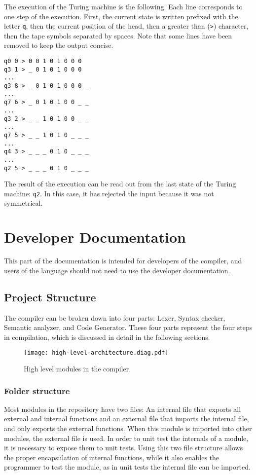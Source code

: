 \documentclass[12pt]{article}
\begin{document}
The execution of the Turing machine is the following. Each line corresponds to
one step of the execution. First, the current state is written prefixed with the
letter \verb$q$, then the current position of the head, then a greater than
(\verb$>$) character, then the tape symbols separated by spaces. Note that some
lines have been removed to keep the output concise.
\begin{lstlisting}
q0 0 > 0 0 1 0 1 0 0 0 
q3 1 > _ 0 1 0 1 0 0 0 
...
q3 8 > _ 0 1 0 1 0 0 0 _ 
...
q7 6 > _ 0 1 0 1 0 0 _ _ 
...
q3 2 > _ _ 1 0 1 0 0 _ _ 
...
q7 5 > _ _ 1 0 1 0 _ _ _ 
...
q4 3 > _ _ _ 0 1 0 _ _ _ 
...
q2 5 > _ _ _ 0 1 0 _ _ _ 
\end{lstlisting}
The result of the execution can be read out from the last state of the Turing
machine: \verb$q2$. In this case, it has rejected the input because it was not
symmetrical.

\lstset{numbers=left}

\pagebreak
\section{Developer Documentation}

This part of the documentation is intended for developers of the compiler, and
users of the language should not need to use the developer documentation.

\subsection{Project Structure}

The compiler can be broken down into four parts: Lexer, Syntax checker, Semantic
analyzer, and Code Generator. These four parts represent the four steps in
compilation, which is discussed in detail in the following sections.

\begin{figure}[h]
\texttt{[image: high-level-architecture.diag.pdf]}
\centering
\caption{High level modules in the compiler.}
\end{figure}

\subsubsection{Folder structure}

Most modules in the repository have two files: An internal file that exports all
external and internal functions and an external file that imports the internal
file, and only exports the external functions. When this module is imported into
other modules, the external file is used. In order to unit test the internals of
a module, it is necessary to expose them to unit tests. Using this two file
structure allows the proper encapsulation of internal functions, while it also
enables the programmer to test the module, as in unit tests the internal file
can be imported.
\end{document}
